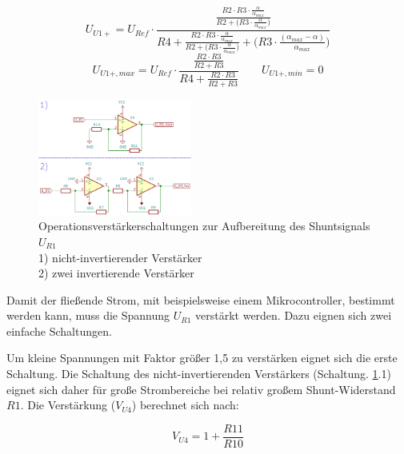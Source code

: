 \begin{equation}
	U_{U1+} = U_{Ref} \cdot \frac{\frac{R2 \cdot R3 \cdot \frac{\alpha}{\alpha_{max}}}
									{R2 + \big(R3 \cdot \frac{\alpha}{\alpha_{max}}\big)}}
							{R4 + \frac{R2 \cdot R3 \cdot \frac{\alpha}{\alpha_{max}}}	
									{R2 + \big(R3 \cdot \frac{\alpha}{\alpha_{max}}\big)} + \Big(R3 \cdot 
									\frac{(\alpha_{max} - \alpha)}{\alpha_{max}} \Big)}
	\label{eq:UOp+}
\end{equation}
\vspace{0,1cm}
\begin{equation}
	U_{U1+,max} = U_{Ref} \cdot \frac{\frac{R2 \cdot R3}{R2 + R3}}
							{R4 + \frac{R2 \cdot R3}{R2 + R3}}
		\qquad		
	U_{U1+,min} = 0
	\label{eq:UU1max_min}
\end{equation}

\begin{figure}[!h]
	\centering
	\includegraphics[width=0.45\textwidth]{Bilder/OP_Schaltung_analyse.PNG}
	\renewcommand*\figurename{Schaltung}
	\caption{Operationsverstärkerschaltungen zur Aufbereitung des Shuntsignals $U_{R1}$\\
		1) nicht-invertierender Verstärker\\
		2) zwei invertierende Verstärker }
	\label{sch:OP_Verstärkung}
\end{figure}

Damit der fließende Strom, mit beispielsweise einem Mikrocontroller, bestimmt werden kann, muss die Spannung $U_{R1}$ verstärkt werden. 
Dazu eignen sich zwei einfache Schaltungen.

Um kleine Spannungen mit Faktor größer 1,5 zu verstärken eignet sich die erste Schaltung. 
Die Schaltung des nicht-invertierenden Verstärkers (Schaltung. \ref{sch:OP_Verstärkung}.1) eignet sich daher für große Strombereiche bei 
relativ großem Shunt-Widerstand $R1$. 
Die Verstärkung ($V_{U4}$) berechnet sich nach:

\begin{equation}
	V_{U4} = 1+ \frac{R11}{R10}
	\label{eq:V_nichtInv}
\end{equation}

